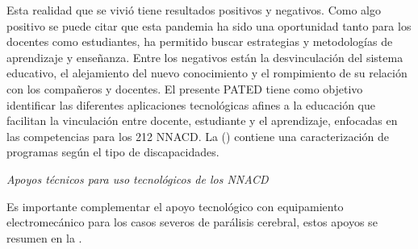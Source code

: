 \documentclass[spanish]{textolivre}
\begin{document}
Esta realidad que se vivió tiene resultados positivos y negativos. Como algo positivo se puede citar que esta pandemia ha sido una oportunidad tanto para los docentes como estudiantes, ha permitido buscar estrategias y metodologías de aprendizaje y enseñanza. Entre los negativos están la desvinculación del sistema educativo, el alejamiento del nuevo conocimiento y el rompimiento de su relación con los compañeros y docentes. El presente PATED tiene como objetivo identificar las diferentes aplicaciones tecnológicas afines a la educación que facilitan la vinculación entre docente, estudiante y el aprendizaje, enfocadas en las competencias para los 212 NNACD. La  () contiene una caracterización de programas según el tipo de discapacidades.


\textit{Apoyos técnicos para uso tecnológicos de los NNACD}

Es importante complementar el apoyo tecnológico con equipamiento electromecánico para los casos severos de parálisis cerebral, estos apoyos se resumen en la .
\end{document}
